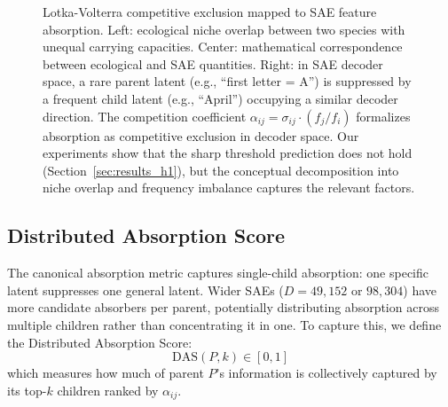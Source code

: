 \documentclass{article}
\begin{document}
\begin{figure}[t]
{
}
\caption{Lotka-Volterra competitive exclusion mapped to SAE feature absorption. Left: ecological niche overlap between two species with unequal carrying capacities. Center: mathematical correspondence between ecological and SAE quantities. Right: in SAE decoder space, a rare parent latent (e.g., ``first letter = A'') is suppressed by a frequent child latent (e.g., ``April'') occupying a similar decoder direction. The competition coefficient $\alpha_{ij} = \sigma_{ij} \cdot (f_j / f_i)$ formalizes absorption as competitive exclusion in decoder space. Our experiments show that the sharp threshold prediction does not hold (Section~\ref{sec:results_h1}), but the conceptual decomposition into niche overlap and frequency imbalance captures the relevant factors.}
\label{fig:lv_framework}
\end{figure}

\subsection{Distributed Absorption Score}
\label{sec:das}

The canonical absorption metric \citep{chanin2024absorption} captures single-child absorption: one specific latent suppresses one general latent. Wider SAEs ($D = 49{,}152$ or $98{,}304$) have more candidate absorbers per parent, potentially distributing absorption across multiple children rather than concentrating it in one. To capture this, we define the Distributed Absorption Score:
\begin{equation}
  \text{DAS}(P, k) \in [0, 1]
\end{equation}
which measures how much of parent $P$'s information is collectively captured by its top-$k$ children ranked by $\alpha_{ij}$.
\end{document}
